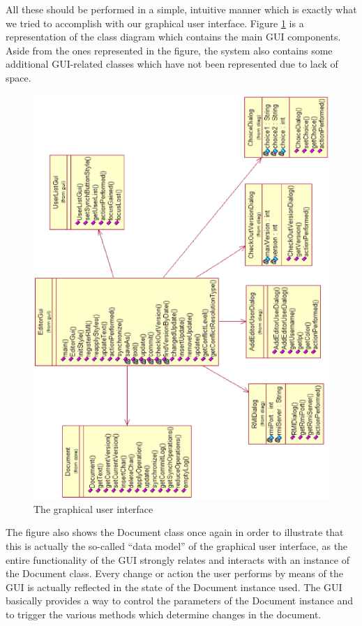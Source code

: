 All these should be performed in a simple, intuitive manner which is exactly what
we tried to accomplish with our graphical user interface. Figure \ref{fig:guiuml} is a
representation of the class diagram which contains the main GUI components. Aside from
the ones represented in the figure, the system also contains some additional GUI-related
classes which have not been represented due to lack of space.

\begin{figure}[htp]
\begin{center}
\includegraphics{img/EditorGuiUML.eps}
\end{center}
\caption{The graphical user interface}
\label{fig:guiuml}
\end{figure}

The figure also shows the Document class once again in order to illustrate that this
is actually the so-called ``data model'' of the graphical user interface, as the entire
functionality of the GUI strongly relates and interacts with an instance of the Document
class. Every change or action the user performs by means of the GUI is actually reflected
in the state of the Document instance used. The GUI basically provides a way to control
the parameters of the Document instance and to trigger the various methods which determine
changes in the document.

